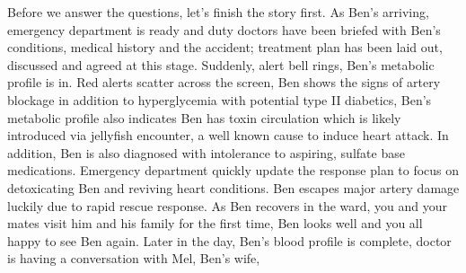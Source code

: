 Before we answer the questions, let's finish the story first. As Ben's arriving, emergency department is ready and duty doctors have been briefed with Ben's conditions, medical history and the accident; treatment plan has been laid out, discussed and agreed at this stage. Suddenly, alert bell rings, Ben's metabolic profile is in. Red alerts scatter across the screen, Ben shows the signs of artery blockage in addition to hyperglycemia with potential type II diabetics, Ben's metabolic profile also indicates Ben has toxin circulation which is likely introduced via jellyfish encounter, a well known cause to induce heart attack. In addition, Ben is also diagnosed with intolerance to aspiring, sulfate base medications. Emergency department quickly update the response plan to focus on  detoxicating Ben and reviving heart conditions. Ben escapes major artery damage luckily due to rapid rescue response. As Ben recovers in the ward, you and your mates visit him and his family for the first time, Ben looks well and you all happy to see Ben again. 
Later in the day, Ben's blood profile is complete, doctor is having a conversation with Mel, Ben's wife, \\
